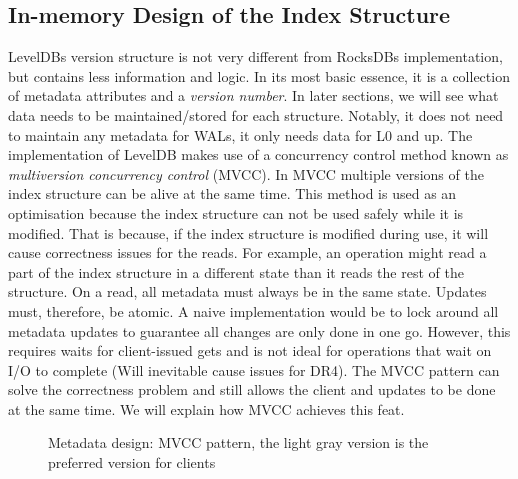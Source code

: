 \subsection{In-memory Design of the Index Structure}
LevelDBs version structure is not very different from RocksDBs implementation, but contains less information and logic. In its most basic essence, it is a collection of metadata attributes and a \textit{version number}. In later sections, we will see what data needs to be maintained/stored for each structure. Notably, it does not need to maintain any metadata for WALs, it only needs data for L0 and up. The implementation of LevelDB makes use of a concurrency control method known as \textit{multiversion concurrency control} (MVCC). In MVCC multiple versions of the index structure can be alive at the same time. This method is used as an optimisation because the index structure can not be used safely while it is modified. That is because, if the index structure is modified during use, it will cause correctness issues for the reads. For example, an operation might read a part of the index structure in a different state than it reads the rest of the structure. On a read, all metadata must always be in the same state. Updates must, therefore, be atomic. A naive implementation would be to lock around all metadata updates to guarantee all changes are only done in one go. However, this requires waits for client-issued gets and is not ideal for operations that wait on I/O to complete (Will inevitable cause issues for DR4). The MVCC pattern can solve the correctness problem and still allows the client and updates to be done at the same time. We will explain how MVCC achieves this feat.

\begin{figure}[h]
\centering
\begin{minipage}{0.75\textwidth}
  \centering
  
\end{minipage}%
\caption{ Metadata design: MVCC pattern, the light gray version is the preferred version for clients }
\label{fig:mvcc}
\end{figure}

